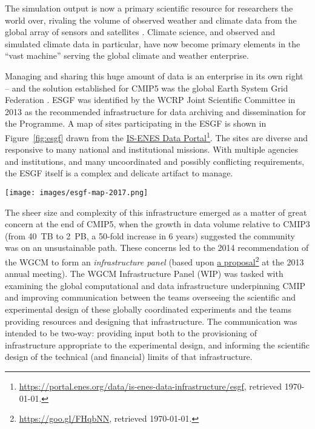 \documentclass[gmd,manuscript]{copernicus}
\newcommand{\urlref}[2] {\href{#1}{#2}\footnote{\url{#1}, retrieved \today.}}
\begin{document}
The simulation output is now a primary scientific resource for
researchers the world over, rivaling the volume of observed weather
and climate data from the global array of sensors and satellites
\citep{ref:overpecketal2011}. Climate science, and observed and simulated
climate data in particular, have now become primary elements in the
``vast machine'' \citep{ref:edwards2010} serving the global climate and
weather enterprise.

Managing and sharing this huge amount of data is an enterprise in its
own right -- and the solution established for CMIP5 was the global
Earth System Grid Federation
\citep[ESGF,][]{ref:williamsetal2011a,ref:williamsetal2015}. ESGF was
identified by the WCRP Joint Scientific Committee in 2013 as the
recommended infrastructure for data archiving and dissemination for
the Programme.
A map of sites participating in the ESGF is shown in
Figure~\ref{fig:esgf} drawn from the
\urlref{https://portal.enes.org/data/is-enes-data-infrastructure/esgf}{IS-ENES
  Data Portal}. The sites are diverse and responsive to many national
and institutional missions. With multiple agencies and institutions,
and many uncoordinated and possibly conflicting requirements, the ESGF
itself is a complex and delicate
artifact to manage.

\begin{figure*}
  \begin{center}
    \texttt{[image: images/esgf-map-2017.png]}
  \end{center}
  \caption{Sites participating in the Earth System Grid Federation in
    May 2017. Figure courtesy IS-ENES Data Portal. }
  \label{fig:esgf}
\end{figure*}

The sheer size and complexity of this infrastructure emerged as a
matter of great concern at the end of CMIP5, when the growth in data
volume relative to CMIP3 (from 40~TB to 2~PB, a 50-fold increase in 6
years) suggested the community was on an unsustainable path. These
concerns led to the 2014 recommendation of the WGCM to form an
\emph{infrastructure panel} (based upon
\urlref{https://goo.gl/FHqbNN}{a proposal} at the 2013 annual
meeting). The WGCM Infrastructure Panel (WIP) was tasked with
examining the global computational and data infrastructure
underpinning CMIP and improving communication between the teams
overseeing the scientific and experimental design of these globally
coordinated experiments and the teams providing resources and
designing that infrastructure. The communication was intended to be
two-way: providing input both to the provisioning of infrastructure
appropriate to the experimental design, and informing the scientific
design of the technical (and financial) limits of that infrastructure.
\end{document}
